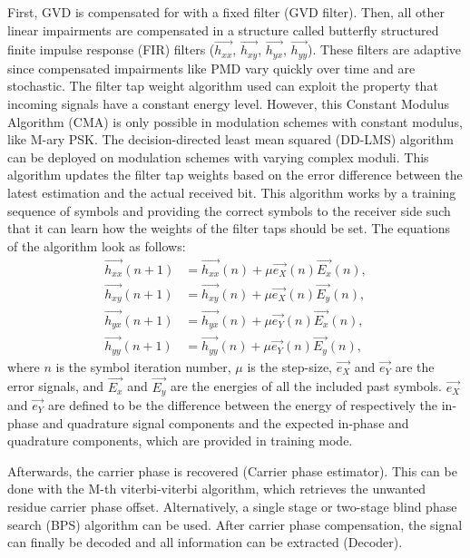 \documentclass[journal,10pt,twoside, a4paper]{IEEEtran}
\begin{document}
First, GVD is compensated for with a fixed filter (GVD filter). Then, all other linear impairments are compensated in a structure called butterfly structured finite impulse response (FIR) filters ($\vec{h_{xx}}$, $\vec{h_{xy}}$, $\vec{h_{yx}}$, $\vec{h_{yy}}$). These filters are adaptive since compensated impairments like PMD vary quickly over time and are stochastic. The filter tap weight algorithm used can exploit the property that incoming signals have a constant energy level. However, this Constant Modulus Algorithm (CMA) is only possible in modulation schemes with constant modulus, like M-ary PSK. The decision-directed least mean squared (DD-LMS) algorithm can be deployed on modulation schemes with varying complex moduli. This algorithm updates the filter tap weights based on the error difference between the latest estimation and the actual received bit. This algorithm works by a training sequence of symbols and providing the correct symbols to the receiver side such that it can learn how the weights of the filter taps should be set. The equations of the algorithm look as follows:
\begin{align}
    \vec{h_{xx}}(n+1) &= \vec{h_{xx}}(n) + \mu \vec{e_{X}}(n)\vec{E_x}(n), \label{dd-lms}\\
    \vec{h_{xy}}(n+1) &= \vec{h_{xy}}(n) + \mu \vec{e_{X}}(n)\vec{E_y}(n),\\
    \vec{h_{yx}}(n+1) &= \vec{h_{yx}}(n) + \mu \vec{e_{Y}}(n)\vec{E_x}(n),\\
    \vec{h_{yy}}(n+1) &= \vec{h_{yy}}(n) + \mu \vec{e_{Y}}(n)\vec{E_y}(n), \label{dd-lms2}
\end{align}
where $n$ is the symbol iteration number, $\mu$ is the step-size, $\vec{e_{X}}$ and $\vec{e_{Y}}$ are the error signals, and $\vec{E_x}$ and $\vec{E_y}$ are the energies of all the included past symbols. $\vec{e_{X}}$ and $\vec{e_{Y}}$ are defined to be the difference between the energy of respectively the in-phase and quadrature signal components and the expected in-phase and quadrature components, which are provided in training mode.

Afterwards, the carrier phase is recovered (Carrier phase estimator). This can be done with the M-th viterbi-viterbi algorithm\cite{coherent_detection,viterbi}, which retrieves the unwanted residue carrier phase offset. Alternatively, a single stage\cite{1stagebps} or two-stage\cite{2stagebps} blind phase search (BPS) algorithm can be used. After carrier phase compensation, the signal can finally be decoded and all information can be extracted (Decoder).
\end{document}
